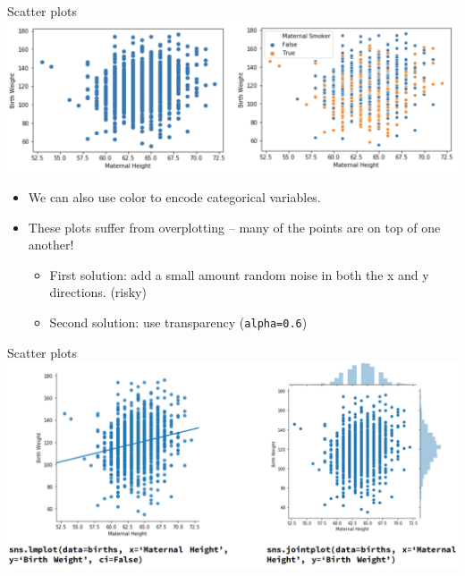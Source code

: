 \documentclass[aspectratio=169]{../latex_main/tntbeamer}  %
\begin{document}
	
	\begin{frame}{Scatter plots}
	    \includegraphics[scale=.35]{Bild46}
	    \begin{itemize}
	        \item We can also use color to encode categorical variables.
	        \item These plots suffer from overplotting – many of the points are on top of one another!
	        \begin{itemize}
	            \item First solution: add a small amount random noise in both the x and y directions. (risky)
	            \item Second solution: use transparency (\texttt{alpha=0.6})
	        \end{itemize}
	    \end{itemize}
	\end{frame}
	
	
	\begin{frame}{Scatter plots}
	    \includegraphics[scale=.4]{Bild47}
	\end{frame}
	
\end{document}

